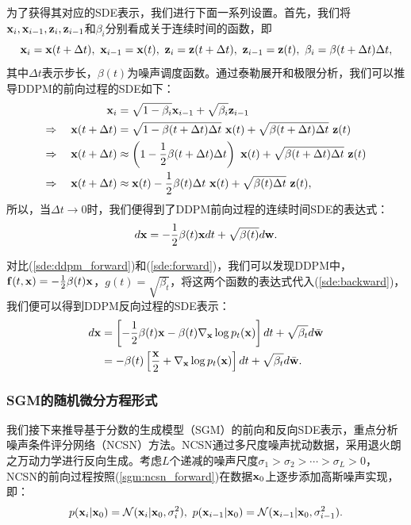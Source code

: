 \documentclass[11pt,a4paper,UTF8]{ctexart}
\begin{document}
为了获得其对应的SDE表示，我们进行下面一系列设置。首先，我们将$\mathbf{x}_i,\mathbf{x}_{i-1},\mathbf{z}_i,\mathbf{z}_{i-1}$和$\beta_i$分别看成关于连续时间的函数，即
\begin{equation*}
    \x_i=\x(t+\Delta t),\ \x_{i-1}=\x(t),\ \z_i=\z(t+\Delta t),\ \z_{i-1}=\z(t),\ \beta_i = \beta(t+\Delta t)\Delta t,
\end{equation*}
其中$\Delta t$表示步长，$\beta(t)$为噪声调度函数。通过泰勒展开和极限分析，我们可以推导DDPM的前向过程的SDE如下：
\begin{align*}
\begin{split}
     \mathbf{x}_i &= \sqrt{1-\beta_i}\mathbf{x}_{i-1} + \sqrt{\beta_i}\mathbf{z}_{i-1} \\
    \Rightarrow\quad  \mathbf{x}(t+\Delta t) &= \sqrt{1-\beta(t+\Delta t)\Delta t}\ \mathbf{x}(t) + \sqrt{ \beta(t+\Delta t)\Delta t}\ \mathbf{z}(t) \\
    \Rightarrow\quad \mathbf{x}(t+\Delta t) &\approx \left(1- \frac{1}{2}\beta(t+\Delta t)\Delta t\right)\ \mathbf{x}(t) + \sqrt{ \beta(t+\Delta t)\Delta t}\ \mathbf{z}(t) \\
    \Rightarrow\quad \mathbf{x}(t+\Delta t) &\approx \mathbf{x}(t) - \frac{1}{2}\beta(t)\Delta t\ \mathbf{x}(t) + \sqrt{ \beta(t)\Delta t}\ \mathbf{z}(t),
\end{split}
\end{align*}
所以，当$\Delta t\rightarrow 0$时，我们便得到了DDPM前向过程的连续时间SDE的表达式：
\begin{equation}
    d\mathbf{x} = -\frac{1}{2}\beta(t)\mathbf{x} dt + \sqrt{\beta(t)}d\mathbf{w}.
\label{sde:ddpm_forward}
\end{equation}

对比(\ref{sde:ddpm_forward})和(\ref{sde:forward})，我们可以发现DDPM中，$\mathbf{f}(t,\mathbf{x})=-\frac{1}{2}\beta(t)\mathbf{x}$，$g(t)=\sqrt{\beta_t}$，将这两个函数的表达式代入(\ref{sde:backward})，我们便可以得到DDPM反向过程的SDE表示：
\begin{align}
\begin{split}
    d\mathbf{x} &= \left[-\frac{1}{2}\beta(t)\mathbf{x} -\beta(t) \nabla_{\mathbf{x}} \log p_t(\mathbf{x}) \right] dt + \sqrt{\beta_t} d\bar{\mathbf{w}} \\
    &= -\beta(t) \left[\frac{\mathbf{x}}{2} + \nabla_{\mathbf{x}} \log p_t(\mathbf{x}) \right]dt + \sqrt{\beta_t} d\bar{\mathbf{w}}.
\end{split} 
\label{sde:ddpm_backward}
\end{align}

\subsubsection{SGM的随机微分方程形式}

我们接下来推导基于分数的生成模型（SGM）的前向和反向SDE表示，重点分析噪声条件评分网络（NCSN）方法\cite{song2020score}。NCSN通过多尺度噪声扰动数据，采用退火朗之万动力学进行反向生成。考虑$L$个递减的噪声尺度$\sigma_1 > \sigma_2 > \cdots > \sigma_L > 0$，NCSN的前向过程按照(\ref{sgm:ncsn_forward})在数据$\mathbf{x}_0$上逐步添加高斯噪声实现，即：
\begin{equation*}
    p(\x_i|\x_0) =\N(\x_i|\x_0,\sigma_i^2),\ p(\x_{i-1}|\x_0) =\N(\x_{i-1}|\x_0,\sigma_{i-1}^2).
\end{equation*}
\end{document}

